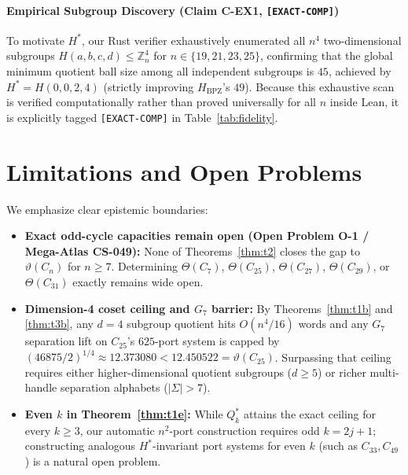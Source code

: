 \documentclass[11pt,reqno]{amsart}
\theoremstyle{definition}
\newcommand{\Z}{\mathbb{Z}}
\newcommand{\Hbpz}{H_{\mathrm{BPZ}}}
\newcommand{\Hstar}{H^*}
\begin{document}
\paragraph{\textbf{Empirical Subgroup Discovery (Claim C-EX1, \texttt{[EXACT-COMP]})}}
To motivate $\Hstar$, our Rust verifier exhaustively enumerated all $n^4$ two-dimensional subgroups $H(a,b,c,d) \le \Z_n^4$ for $n \in \{19,21,23,25\}$, confirming that the global minimum quotient ball size among all independent subgroups is $45$, achieved by $\Hstar = H(0,0,2,4)$ (strictly improving $\Hbpz$'s $49$). Because this exhaustive scan is verified computationally rather than proved universally for all $n$ inside Lean, it is explicitly tagged \texttt{[EXACT-COMP]} in Table~\ref{tab:fidelity}.

\section{Limitations and Open Problems}\label{sec:limitations}

We emphasize clear epistemic boundaries:
\begin{itemize}[leftmargin=2em,itemsep=2pt]
  \item \textbf{Exact odd-cycle capacities remain open (Open Problem O-1 / Mega-Atlas CS-049):} None of Theorems~\ref{thm:t2} closes the gap to $\vartheta(C_n)$ for $n \ge 7$. Determining $\Theta(C_7)$, $\Theta(C_{25})$, $\Theta(C_{27})$, $\Theta(C_{29})$, or $\Theta(C_{31})$ exactly remains wide open.
  \item \textbf{Dimension-4 coset ceiling and $G_7$ barrier:} By Theorems~\ref{thm:t1b} and \ref{thm:t3b}, any $d=4$ subgroup quotient hits $O(n^4/16)$ words and any $G_7$ separation lift on $C_{25}$'s $625$-port system is capped by $(46875/2)^{1/4} \approx 12.373080 < 12.450522 = \vartheta(C_{25})$. Surpassing that ceiling requires either higher-dimensional quotient subgroups ($d \ge 5$) or richer multi-handle separation alphabets ($|\Sigma| > 7$).
  \item \textbf{Even $k$ in Theorem~\ref{thm:t1e}:} While $Q^*_k$ attains the exact ceiling for every $k \ge 3$, our automatic $n^2$-port construction requires odd $k = 2j+1$; constructing analogous $\Hstar$-invariant port systems for even $k$ (such as $C_{33}, C_{49}$) is a natural open problem.
\end{itemize}

\end{document}
